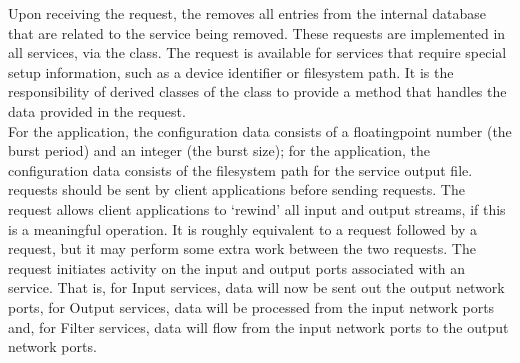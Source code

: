 Upon receiving the  request, the
 removes all entries from the internal database that
are related to the service being removed.
\secondaryEnd
{}
These requests are implemented in all \mplusm{}  services, via the
 class.
The  request is available for
 services that require special setup information, such as a device
identifier or file\longDash{}system path.
It is the responsibility of derived classes of the
 class to provide a method that handles the
data provided in the  request.\\

For the  application, the
configuration data consists of a floating\longDash{}point number (the burst period) and an
integer (the burst size); for the 
application, the configuration data consists of the file\longDash{}system path for the
service output file.\\

 requests should be sent by
client applications before sending
 requests.
The  request allows client
applications to `rewind' all input and output streams, if this is a meaningful operation.
It is roughly equivalent to a 
request followed by a  request,
but it may perform some extra work between the two requests.
The  request initiates activity
on the input and output ports associated with an  service.
That is, for Input services, data will now be sent out the output \yarp{} network ports,
for Output services, data will be processed from the input \yarp{} network ports and, for
Filter services, data will flow from the input \yarp{} network ports to the output \yarp{}
network ports.\\

